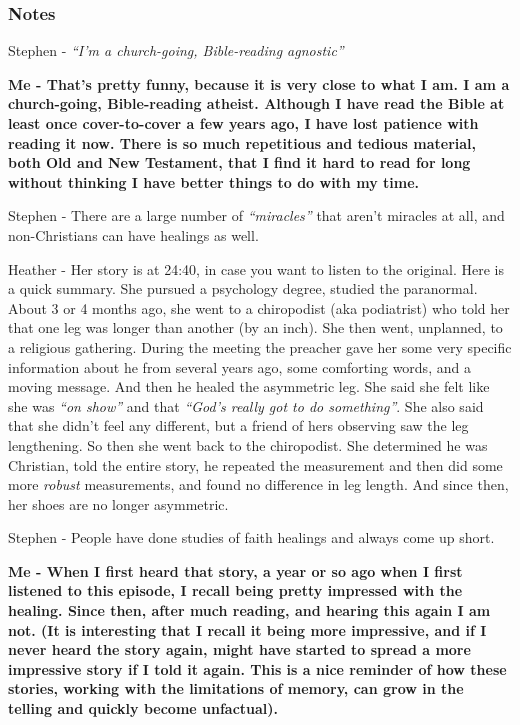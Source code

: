 \documentclass{tufte-book}
\begin{document}
\subsubsection{Notes}\label{notes}

Stephen - \emph{``I'm a church-going, Bible-reading agnostic''}

\textbf{Me - That's pretty funny, because it is very close to what I am.
I am a church-going, Bible-reading atheist. Although I have read the
Bible at least once cover-to-cover a few years ago, I have lost patience
with reading it now. There is so much repetitious and tedious material,
both Old and New Testament, that I find it hard to read for long without
thinking I have better things to do with my time.\\}

Stephen - There are a large number of \emph{``miracles''} that aren't
miracles at all, and non-Christians can have healings as well.

Heather - Her story is at 24:40, in case you want to listen to the
original. Here is a quick summary. She pursued a psychology degree,
studied the paranormal. About 3 or 4 months ago, she went to a
chiropodist (aka podiatrist) who told her that one leg was longer than
another (by an inch). She then went, unplanned, to a religious
gathering. During the meeting the preacher gave her some very specific
information about he from several years ago, some comforting words, and
a moving message. And then he healed the asymmetric leg. She said she
felt like she was \emph{``on show''} and that \emph{``God's really got
to do something''}. She also said that she didn't feel any different,
but a friend of hers observing saw the leg lengthening. So then she went
back to the chiropodist. She determined he was Christian, told the
entire story, he repeated the measurement and then did some more
\emph{robust} measurements, and found no difference in leg length. And
since then, her shoes are no longer asymmetric.

Stephen - People have done studies of faith healings and always come up
short.

\textbf{Me - When I first heard that story, a year or so ago when I
first listened to this episode, I recall being pretty impressed with the
healing. Since then, after much reading, and hearing this again I am
not. (It is interesting that I recall it being more impressive, and if I
never heard the story again, might have started to spread a more
impressive story if I told it again. This is a nice reminder of how
these stories, working with the limitations of memory, can grow in the
telling and quickly become unfactual).\\}
\end{document}

